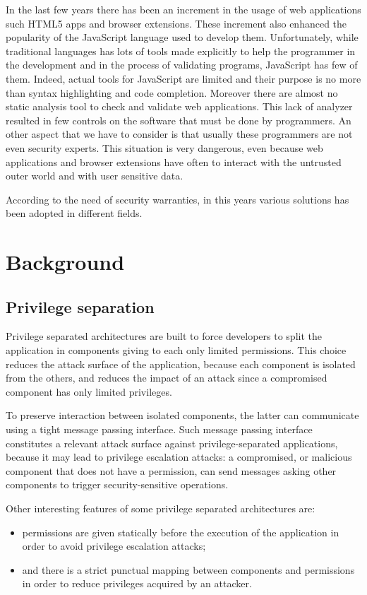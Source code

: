 In the last few years there has been an increment in the usage of web applications such HTML5 apps and browser extensions. These increment also enhanced the popularity of the JavaScript language used to develop them. Unfortunately, while traditional languages has lots of tools made explicitly to help the programmer in the development and in the process of validating programs, JavaScript has few of them. Indeed, actual tools for JavaScript are limited and their purpose is no more than syntax highlighting and code completion. Moreover there are almost no static analysis tool to check and validate web applications. This lack of analyzer resulted in few controls on the software that must be done by programmers. An other aspect that we have to consider is that usually these programmers are not even security experts. This situation is very dangerous, even because web applications and browser extensions have often to interact with the untrusted outer world and with user sensitive data.

According to the need of security warranties, in this years various solutions has been adopted in different fields.

\section{Background}

\subsection{Privilege separation}
\label{sec:PriviSep}
Privilege separated architectures are built to force developers to split the application in components giving to each only limited permissions. This choice reduces the attack surface of the application, because each component is isolated from the others, and reduces the impact of an attack since a compromised component has only limited privileges. 

To preserve interaction between isolated components, the latter can communicate using a tight message passing interface. Such message passing interface constitutes a relevant attack surface against privilege-separated applications, because it may lead to privilege escalation attacks: a compromised, or malicious component that does not have a permission, can send messages asking other components to trigger security-sensitive operations.

Other interesting features of some privilege separated architectures are:
\begin{itemize}
\item permissions are given statically before the execution of the application in order to avoid privilege escalation attacks;
\item and there is a strict punctual mapping between components and permissions in order to reduce privileges acquired by an attacker.
\end{itemize}

